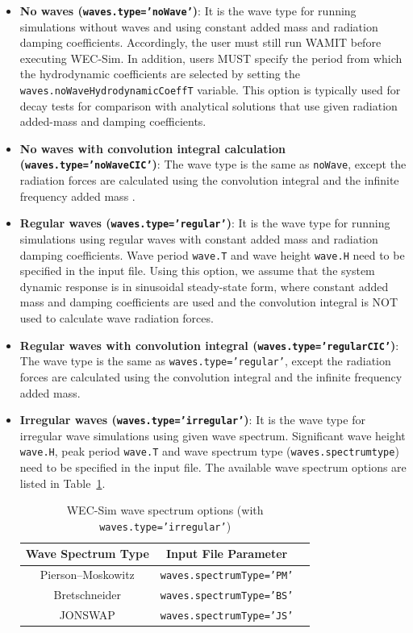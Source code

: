 \begin{itemize}
\item \textbf{No waves (\texttt{waves.type='noWave'})}: It is the wave type for running simulations without waves and using constant added mass and radiation damping coefficients. Accordingly, the user must still run WAMIT before executing WEC-Sim. In addition, users MUST specify the period from which the hydrodynamic coefficients are selected by setting the \texttt{waves.noWaveHydrodynamicCoeffT} variable. This option is typically used for decay tests for comparison with analytical solutions that use given radiation added-mass and damping coefficients.

\item \textbf{No waves with convolution integral calculation (\texttt{waves.type='noWaveCIC'})}: The wave type is the same as \texttt{noWave}, except the radiation forces are calculated using the convolution integral and the infinite frequency added mass .

\item \textbf{Regular waves (\texttt{waves.type='regular'})}: It is the wave type for running simulations using regular waves with constant added mass and radiation damping coefficients. Wave period \texttt{wave.T} and wave height \texttt{wave.H} need to be specified in the input file. Using this option, we assume that the system dynamic response is in sinusoidal steady-state form, where constant added mass and damping coefficients are used and the convolution integral is NOT used to calculate wave radiation forces.

\item \textbf{Regular waves with convolution integral (\texttt{waves.type='regularCIC'})}: The wave type is the same as \texttt{waves.type='regular'}, except the radiation forces are calculated using the convolution integral and the infinite frequency added mass.
\clearpage
\item \textbf{Irregular waves (\texttt{waves.type='irregular'})}: It is the wave type for irregular wave simulations using given wave spectrum. Significant wave height \texttt{wave.H}, peak period \texttt{wave.T} and  wave spectrum type (\texttt{waves.spectrumtype}) need to be specified in the input file. The available wave spectrum options are listed in Table~\ref{Table: Available wave spectrum options}.

\begin{table}[H]
\noindent \centering{}\protect\caption{WEC-Sim wave spectrum options (with \texttt{waves.type='irregular'})}
\begin{tabular}{|c|c|c|}
\hline 
\textbf{Wave Spectrum Type}  & \textbf{Input File Parameter} \tabularnewline
\hline 
Pierson--Moskowitz &\texttt{waves.spectrumType='PM'}\tabularnewline
\hline 
Bretschneider &\texttt{waves.spectrumType='BS'}\tabularnewline
\hline 
JONSWAP &\texttt{waves.spectrumType='JS'}\tabularnewline
\hline 
\end{tabular}
\label{Table: Available wave spectrum options}
\end{table}


\end{itemize}
